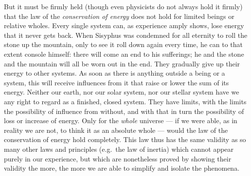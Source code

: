 \documentclass[12pt,a4paper]{book}
\newcommand{\opage}[1]{\marginnote{\footnotesize\textit{[#1]}}}
\begin{document}
But it must be firmly held (though even physicists do not always hold
it firmly) that the law of the \emph{conservation of energy} does not
hold for limited beings or relative wholes. Every single system can, as
experience amply shows, lose energy that it never gets back. When
Sisyphus was condemned for all
\opage{40}eternity to roll the stone up the mountain, only to see it roll
down again every time, he can to that extent console himself: there
will come an end to his sufferings; he and the stone and the mountain
will all be worn out in the end. They gradually give up their energy to
other systems. As soon as there is anything outside a being or a
system, this will receive influences from it that raise or lower the sum
of its energy. Neither our earth, nor our solar system, nor our stellar
system have we any right to regard as a finished, closed system. They
have limits, with the limits the possibility of influence from without,
and with that in turn the possibility of loss or increase of energy.
Only for the \emph{whole} universe --- if we were able, as in reality we
are not, to think it as an absolute whole --- would the law of the
conservation of energy hold completely. This law thus has the same
validity as so many other laws and principles (e.g.\ the law of inertia)
which cannot appear purely in our experience, but which are nonetheless
proved by showing their validity the more, the more we are able to
simplify and isolate the phenomena.
\end{document}
